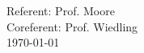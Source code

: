 
\maketitle		

\thispagestyle{empty}

\begin{center}
	
	Referent: Prof. Moore \\[0.5cm]
	Coreferent: Prof. Wiedling \\[2cm]
	\today
\end{center}


\vspace{1.4cm}


\linespread {1.25}\selectfont %



	

\newpage		
\tableofcontents
